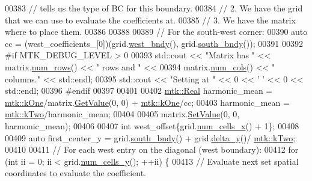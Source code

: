 \begin{DoxyCode}
00383   \textcolor{comment}{// tells us the type of BC for this boundary.}
00384   \textcolor{comment}{// 2. We have the grid that we can use to evaluate the coefficients at.}
00385   \textcolor{comment}{// 3. We have the matrix where to place them.}
00386 
00388 
00389   \textcolor{comment}{// For the south-west corner:}
00390   \textcolor{keyword}{auto} cc = (west\_coefficients\_[0])(grid.\hyperlink{classmtk_1_1UniStgGrid2D_af2b1712387ded85edaf2b64617d3fc13}{west\_bndy}(), grid.\hyperlink{classmtk_1_1UniStgGrid2D_a1442eaf219f099d0ebf46a170fdebf92}{south\_bndy}());
00391 
00392 \textcolor{preprocessor}{  #if MTK\_DEBUG\_LEVEL > 0}
00393   std::cout << \textcolor{stringliteral}{"Matrix has "} << matrix.\hyperlink{classmtk_1_1DenseMatrix_a53f3afb3b6a8d21854458aaa9663cc74}{num\_rows}() << \textcolor{stringliteral}{" rows and "} <<
00394     matrix.\hyperlink{classmtk_1_1DenseMatrix_a41747502d468c6728a4be31501b16e0e}{num\_cols}() << \textcolor{stringliteral}{" columns."} << std::endl;
00395   std::cout << \textcolor{stringliteral}{"Setting at "} << 0 << \textcolor{charliteral}{' '} << 0 << std::endl;
00396 \textcolor{preprocessor}{  #endif}
00397 
00401 
00402   \hyperlink{group__c01-roots_gac080bbbf5cbb5502c9f00405f894857d}{mtk::Real} harmonic\_mean = \hyperlink{group__c01-roots_ga26407c24d43b6b95480943340d285c71}{mtk::kOne}/matrix.\hyperlink{classmtk_1_1DenseMatrix_a4b23ecbebd970b5eea915dbb50691024}{GetValue}(0, 0) + 
      \hyperlink{group__c01-roots_ga26407c24d43b6b95480943340d285c71}{mtk::kOne}/cc;
00403   harmonic\_mean = \hyperlink{group__c01-roots_gaf39c2d851a2db744f4feb1c5ab3ec2cf}{mtk::kTwo}/harmonic\_mean;
00404 
00405   matrix.\hyperlink{classmtk_1_1DenseMatrix_a784ce5784109ac86bfb9d8562b334b13}{SetValue}(0, 0, harmonic\_mean);
00406 
00407   \textcolor{keywordtype}{int} west\_offset\{grid.\hyperlink{classmtk_1_1UniStgGrid2D_a2d182866a398aba8e4829590e85bf939}{num\_cells\_x}() + 1\};
00408 
00409   \textcolor{keyword}{auto} first\_center\_y = grid.\hyperlink{classmtk_1_1UniStgGrid2D_a1442eaf219f099d0ebf46a170fdebf92}{south\_bndy}() + grid.\hyperlink{classmtk_1_1UniStgGrid2D_a65a78cfc80ffdbeb282ed57af4dc5cb4}{delta\_y}()/
      \hyperlink{group__c01-roots_gaf39c2d851a2db744f4feb1c5ab3ec2cf}{mtk::kTwo};
00410 
00411   \textcolor{comment}{// For each west entry on the diagonal (west boundary):}
00412   \textcolor{keywordflow}{for} (\textcolor{keywordtype}{int} ii = 0; ii < grid.\hyperlink{classmtk_1_1UniStgGrid2D_aed05a801cc9a76dba0ff203cea58a61a}{num\_cells\_y}(); ++ii) \{
00413     \textcolor{comment}{// Evaluate next set spatial coordinates to evaluate the coefficient.}

\end{DoxyCode}
